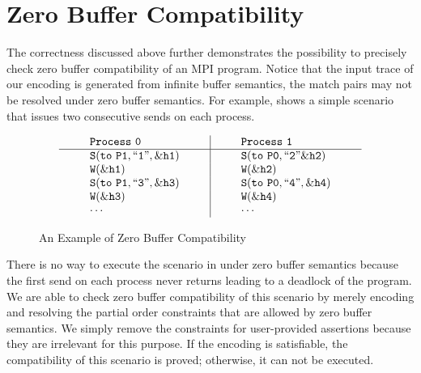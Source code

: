 \section{Zero Buffer Compatibility}
The correctness discussed above further demonstrates the possibility to precisely check zero buffer compatibility of an MPI program. Notice that the input trace of our encoding is generated from infinite buffer semantics, the match pairs may not be resolved under zero buffer semantics. For example,  shows a simple scenario that issues two consecutive sends on each process. 

\begin{figure}[h]
\[
\begin{array}{l|l}
\;\;\;\;\;\;\;\;\mathtt{Process\ 0}\;\;\;\;\;\;\;\; & \;\;\;\;\;\;\;\; \mathtt{Process\ 1}\;\;\;\;\;\;\;\; \\
\hline
\;\;\;\;\;\;\;\;\mathtt{S(to\ P1, ``1",\&h1)}\;\;\;\;\;\;\;\; & \;\;\;\;\;\;\;\; \mathtt{S(to\ P0,``2"\&h2)}\;\;\;\;\;\;\;\; \\
\;\;\;\;\;\;\;\;\mathtt{W(\&h1)}\;\;\;\;\;\;\;\; & \;\;\;\;\;\;\;\; \mathtt{W(\&h2)}\;\;\;\;\;\;\;\; \\
\;\;\;\;\;\;\;\;\mathtt{S(to\ P1,``3",\&h3)}\;\;\;\;\;\;\;\; & \;\;\;\;\;\;\;\; \mathtt{S(to\ P0,``4",\&h4)}\;\;\;\;\;\;\;\; \\
\;\;\;\;\;\;\;\;\mathtt{W(\&h3)}\;\;\;\;\;\;\;\; & \;\;\;\;\;\;\;\; \mathtt{W(\&h4)}\;\;\;\;\;\;\;\; \\
\;\;\;\;\;\;\;\;\mathtt{\cdots}\;\;\;\;\;\;\;\; & \;\;\;\;\;\;\;\; \mathtt{\cdots}\;\;\;\;\;\;\;\; 
\end{array}
\]
\caption{An Example of Zero Buffer Compatibility} \label{fig:compatible}
\end{figure}

There is no way to execute the scenario in  under zero buffer semantics because the first send on each process never returns leading to a deadlock of the program. We are able to check zero buffer compatibility of this scenario by merely encoding and resolving the partial order constraints that are allowed by zero buffer semantics. We simply remove the constraints for user-provided assertions because they are irrelevant for this purpose. If the encoding is satisfiable, the compatibility of this scenario is proved; otherwise, it can not be executed. 